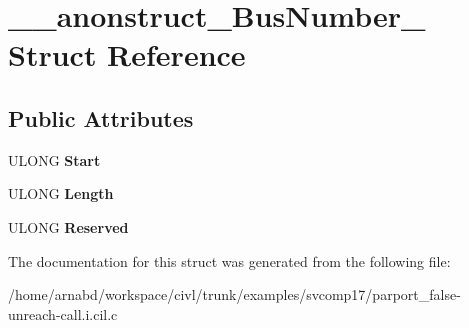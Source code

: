 \hypertarget{struct____anonstruct__BusNumber__22}{}\section{\+\_\+\+\_\+anonstruct\+\_\+\+Bus\+Number\+\_ Struct Reference}
\label{struct____anonstruct__BusNumber__22}
\subsection*{Public Attributes}
\begin{DoxyCompactItemize}
\item 
\hypertarget{struct____anonstruct__BusNumber__22_a3bc267ee00c97783b3d62b5a8f57801f}{}U\+L\+O\+N\+G {\bfseries Start}\label{struct____anonstruct__BusNumber__22_a3bc267ee00c97783b3d62b5a8f57801f}

\item 
\hypertarget{struct____anonstruct__BusNumber__22_a425d2be99a2c1d6dde9578820dd114e1}{}U\+L\+O\+N\+G {\bfseries Length}\label{struct____anonstruct__BusNumber__22_a425d2be99a2c1d6dde9578820dd114e1}

\item 
\hypertarget{struct____anonstruct__BusNumber__22_a3a41226db03218497f1bf34d9ce79fad}{}U\+L\+O\+N\+G {\bfseries Reserved}\label{struct____anonstruct__BusNumber__22_a3a41226db03218497f1bf34d9ce79fad}

\end{DoxyCompactItemize}


The documentation for this struct was generated from the following file\+:\begin{DoxyCompactItemize}
\item 
/home/arnabd/workspace/civl/trunk/examples/svcomp17/parport\+\_\+false-\/unreach-\/call.\+i.\+cil.\+c\end{DoxyCompactItemize}
